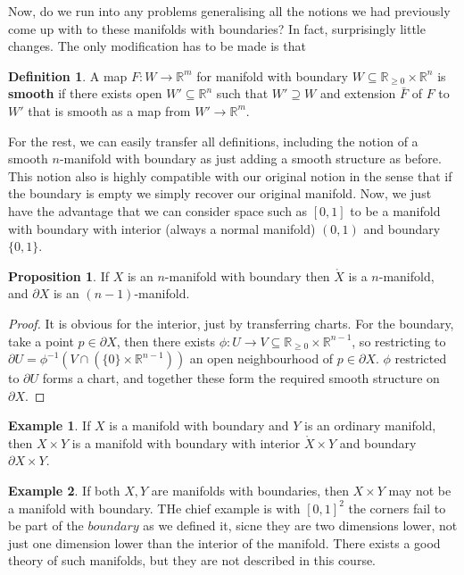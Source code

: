 \documentclass{article}
\theoremstyle{definition}
\newtheorem{definition}{Definition}
\newtheorem{proposition}{Proposition}
\newtheorem{example}{Example}
\begin{document}
Now, do we run into any problems generalising all the notions we had previously
come up with to these manifolds with boundaries? In fact, surprisingly little
changes. The only modification has to be made is that

\begin{definition}
A map $F : W \to \mathbb{R}^m$ for manifold with boundary $W \subseteq
\mathbb{R}_{\geq 0} \times \mathbb{R}^n$ is \textbf{smooth}
if there exists open $W' \subseteq \mathbb{R}^n$ such that $W' \supseteq W$ and
extension $\bar{F}$ of $F$ to $W'$ that is smooth as a map from $W' \to
\mathbb{R}^m$. 
\end{definition}

For the rest, we can easily transfer all definitions, including the notion of a
smooth $n$-manifold with boundary as just adding a smooth structure as before.
This notion also is highly compatible with our original notion in the sense that
if the boundary is empty we simply recover our original manifold. Now, we just
have the advantage that we can consider space such as $[0, 1]$ to be a manifold
with boundary with interior (always a normal manifold) $(0, 1)$ and boundary
$\{0, 1\}$.

\begin{proposition}
If $X$ is an $n$-manifold with boundary then $\mathring{X}$ is a $n$-manifold,
and $\partial X$ is an $(n - 1)$-manifold.
\end{proposition}
\begin{proof}
  It is obvious for the interior, just by transferring charts. For the boundary,
  take a point $p \in \partial X$, then there exists $\phi : U \to V \subseteq
  \mathbb{R}_{\geq 0} \times \mathbb{R}^{n - 1}$, so restricting to $\partial U
  = \phi^{-1}(V \cap (\{0\} \times \mathbb{R}^{n - 1}))$ an open neighbourhood
  of $p \in \partial X$. $\phi$ restricted to $\partial U$ forms a chart, and
  together these form the required smooth structure on $\partial X$.
\end{proof}

\begin{example}
  If $X$ is a manifold with boundary and $Y$ is an ordinary manifold, then $X
  \times Y$ is a manifold with boundary with interior $\mathring{X} \times Y$
  and boundary $\partial X \times Y$.
\end{example}

\begin{example}
  If both $X, Y$ are manifolds with boundaries, then $X \times Y$ may not be a
  manifold with boundary. THe chief example is with $[0, 1]^2$ the corners fail
  to be part of the $boundary$ as we defined it, sicne they are two dimensions
  lower, not just one dimension lower than the interior of the manifold. There
  exists a good theory of such manifolds, but they are not described in this
  course.
\end{example}
\end{document}
